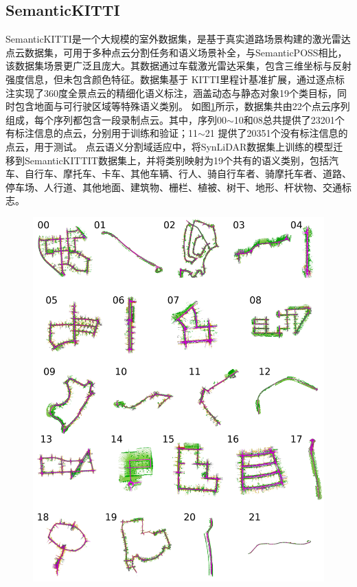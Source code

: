 \subsection{SemanticKITTI}
SemanticKITTI是一个大规模的室外数据集，是基于真实道路场景构建的激光雷达点云数据集，可用于多种点云分割任务和语义场景补全，与SemanticPOSS相比，该数据集场景更广泛且庞大。其数据通过车载激光雷达采集，包含三维坐标与反射强度信息，但未包含颜色特征。数据集基于 KITTI里程计基准扩展，通过逐点标注实现了360度全景点云的精细化语义标注，涵盖动态与静态对象19个类目标，同时包含地面与可行驶区域等特殊语义类别。
如图\ref{fig:2-6}所示，数据集共由22个点云序列组成，每个序列都包含一段录制点云。其中，序列00$\sim$10和08总共提供了23201个有标注信息的点云，分别用于训练和验证；11$\sim$21 提供了20351个没有标注信息的点云，用于测试。
点云语义分割域适应中，将SynLiDAR数据集上训练的模型迁移到SemanticKITTIT数据集上，并将类别映射为19个共有的语义类别，包括汽车、自行车、摩托车、卡车、其他车辆、行人、骑自行车者、骑摩托车者、道路、停车场、人行道、其他地面、建筑物、栅栏、植被、树干、地形、杆状物、交通标志。
\vspace{-0.1cm}
\begin{figure}[H]
    \centering
    \includegraphics[width = \textwidth, scale=0.5]{ljx/figure/2-5/kitti.png}
    \label{fig:2-6}
\end{figure}
\vspace{-0.35cm} 
